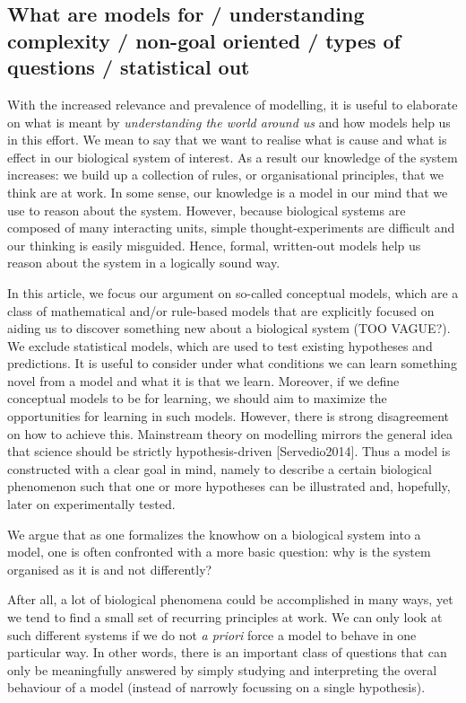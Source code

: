 \subsection{What are models for / understanding complexity / non-goal oriented / types of questions / statistical out}

With the increased relevance and prevalence of modelling, it is useful to elaborate on what is meant by \emph{understanding the world around us} and how models help us in this effort. We mean to say that we want to realise what is cause and what is effect in our biological system of interest. As a result our knowledge of the system increases: we build up a collection of rules, or organisational principles, that we think are at work. In some sense, our knowledge is a model in our mind that we use to reason about the system. However, because biological systems are composed of many interacting units, simple thought-experiments are difficult and our thinking is easily misguided. Hence, formal, written-out models help us reason about the system in a logically sound way.

In this article, we focus our argument on so-called conceptual models, which are a class of mathematical and/or rule-based models that are explicitly focused on aiding us to discover something new about a biological system (TOO VAGUE?). We exclude statistical models, which are used to test existing hypotheses and predictions. It is useful to consider under what conditions we can learn something novel from a model and what it is that we learn. Moreover, if we define conceptual models to be for learning, we should aim to maximize the opportunities for learning in such models. However, there is strong disagreement on how to achieve this. Mainstream theory on modelling mirrors the general idea that science should be strictly hypothesis-driven [Servedio2014]. Thus a model is constructed with a clear goal in mind, namely to describe a certain biological phenomenon such that one or more hypotheses can be illustrated and, hopefully, later on experimentally tested.

We argue that as one formalizes the knowhow on a biological system into a model, one is often confronted with a more basic question: why is the system organised as it is and not differently? 

After all, a lot of biological phenomena could be accomplished in many ways, yet we tend to find a small set of recurring principles at work. We can only look at such different systems if we do not \emph{a priori} force a model to behave in one particular way. In other words, there is an important class of questions that can only be meaningfully answered by simply studying and interpreting the overal behaviour of a model (instead of narrowly focussing on a single hypothesis).
